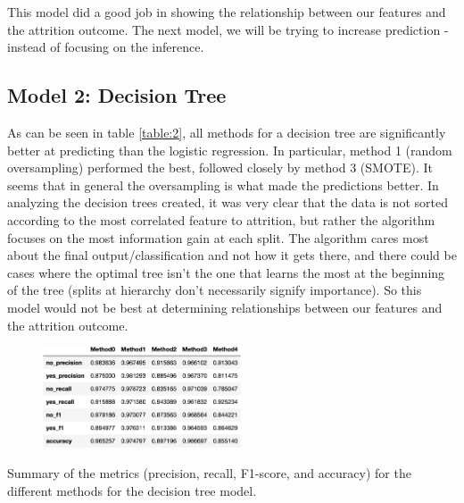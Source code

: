 \documentclass{article}
\begin{document}
This model did a good job in showing the relationship between our features and the attrition outcome. The next model, we will be trying to increase prediction - instead of focusing on the inference.



\subsection{Model 2: Decision Tree}
\vspace{-2mm} 
As can be seen in table \ref{table:2}, all methods for a decision tree are significantly better at predicting than the logistic regression. In particular, method 1 (random oversampling) performed the best, followed closely by method 3 (SMOTE). It seems that in general the oversampling is what made the predictions better. In analyzing the decision trees created, it was very clear that the data is not sorted according to the most correlated feature to attrition, but rather the algorithm focuses on the most information gain at each split. The algorithm cares most about the final output/classification and not how it gets there, and there could be cases where the optimal tree isn't the one that learns the most at the beginning of the tree (splits at hierarchy don’t necessarily signify importance). So this model would not be best at determining relationships between our features and the attrition outcome.

\begin{table}[htbp]
\includegraphics[width=8cm, height=3cm]{decision_tree_comparison.png}
\caption{Summary of the metrics (precision, recall, F1-score, and accuracy) for the different methods for the decision tree model.}
\label{table:2} 
\vspace{-4mm}%
\end{table}
\end{document}
